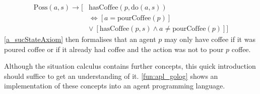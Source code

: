 \begin{equation}\label{a_sucStateAxiom}
  \begin{split}
    \mathrm{Poss}(a,s)\rightarrow \big[&\mathrm{hasCoffee}(p,\mathrm{do}(a,s))
\\    &\Leftrightarrow [a=\mathrm{pourCoffee}(p)]
\\    &\vee\ [\mathrm{hasCoffee}(p,s) \wedge a\neq \mathrm{pourCoffee}(p)]\big]
  \end{split}
\end{equation}
\autoref{a_sucStateAxiom} then formalises that an agent $p$ may only have coffee if it was poured coffee or if it already had coffee and the action was not to pour $p$ coffee.

Although the situation calculus contains further concepts, this quick introduction should suffice to get an understanding of it.
\autoref{fun:apl_golog} shows an implementation of these concepts into an agent programming language.
